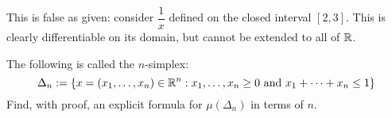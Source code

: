 \begin{soln}
    This is false as given: consider $ \dfrac{1}{x} $ defined on the closed
    interval $ [2,3] $. This is clearly differentiable on its domain, but cannot
    be extended to all of $ \mathbb{R} $.
\end{soln}

\newpage
\label{q37}
\begin{qu}[title=A Mathematician's Dream,num=37]
    The following is called the $ n $-simplex:
    \begin{equation*}
        \Delta_{n} :=
        \left\{{x = (x_{1}, \dots, x_{n}) \in \mathbb{R}^{n}:
        x_{1}, \dots, x_{n} \geq 0 \textrm{ and } x_{1} + \dots + x_{n} \leq 1}\right\}
    \end{equation*}
    Find, with proof, an explicit formula for $ \mu(\Delta_{n}) $ in terms of
    $ n $.
\end{qu}

